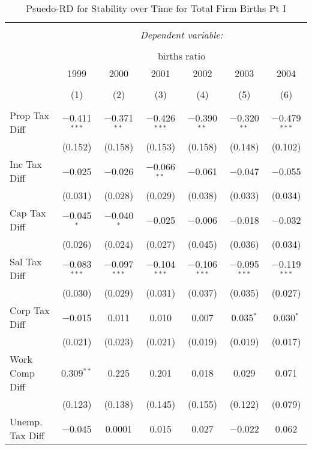 
\begin{table}[!htbp] \centering 
  \caption{Psuedo-RD for Stability over Time for  Total Firm Births Pt I} 
  \label{--year} 
\small 
\begin{tabular}{@{\extracolsep{5pt}}lcccccc} 
\\[-1.8ex]\hline 
\hline \\[-1.8ex] 
 & \multicolumn{6}{c}{\textit{Dependent variable:}} \\ 
\cline{2-7} 
\\[-1.8ex] & \multicolumn{6}{c}{births ratio} \\ 
 & 1999 & 2000 & 2001 & 2002 & 2003 & 2004 \\ 
\\[-1.8ex] & (1) & (2) & (3) & (4) & (5) & (6)\\ 
\hline \\[-1.8ex] 
 Prop Tax Diff & $-$0.411$^{***}$ & $-$0.371$^{**}$ & $-$0.426$^{***}$ & $-$0.390$^{**}$ & $-$0.320$^{**}$ & $-$0.479$^{***}$ \\ 
  & (0.152) & (0.158) & (0.153) & (0.158) & (0.148) & (0.102) \\ 
  Inc Tax Diff & $-$0.025 & $-$0.026 & $-$0.066$^{**}$ & $-$0.061 & $-$0.047 & $-$0.055 \\ 
  & (0.031) & (0.028) & (0.029) & (0.038) & (0.033) & (0.034) \\ 
  Cap Tax Diff & $-$0.045$^{*}$ & $-$0.040$^{*}$ & $-$0.025 & $-$0.006 & $-$0.018 & $-$0.032 \\ 
  & (0.026) & (0.024) & (0.027) & (0.045) & (0.036) & (0.034) \\ 
  Sal Tax Diff & $-$0.083$^{***}$ & $-$0.097$^{***}$ & $-$0.104$^{***}$ & $-$0.106$^{***}$ & $-$0.095$^{***}$ & $-$0.119$^{***}$ \\ 
  & (0.030) & (0.029) & (0.031) & (0.037) & (0.035) & (0.027) \\ 
  Corp Tax Diff & $-$0.015 & 0.011 & 0.010 & 0.007 & 0.035$^{*}$ & 0.030$^{*}$ \\ 
  & (0.021) & (0.023) & (0.021) & (0.019) & (0.019) & (0.017) \\ 
  Work Comp Diff & 0.309$^{**}$ & 0.225 & 0.201 & 0.018 & 0.029 & 0.071 \\ 
  & (0.123) & (0.138) & (0.145) & (0.155) & (0.122) & (0.079) \\ 
  Unemp. Tax Diff & $-$0.045 & 0.0001 & 0.015 & 0.027 & $-$0.022 & 0.062 \\ 

\end{tabular}
\end{table}
